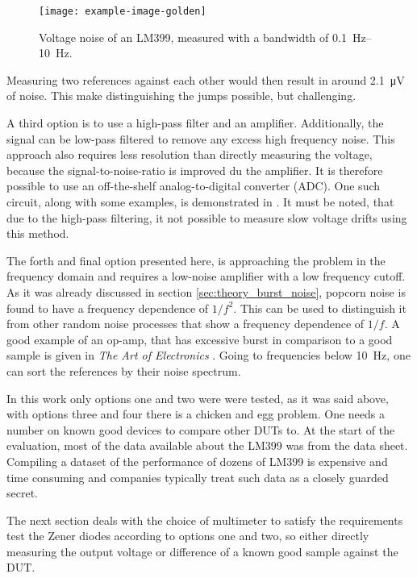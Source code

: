 \begin{figure}[ht]
    \centering
    \texttt{[image: example-image-golden]}
    \caption{Voltage noise of an LM399, measured with a bandwidth of \qtyrange{0.1}{10}{\Hz}.}
    \label{fig:noise_lm399}
\end{figure}

Measuring two references against each other would then result in around \qty{2.1}{\micro \volt} of noise. This make distinguishing the jumps possible, but challenging.

A third option is to use a high-pass filter and an amplifier. Additionally, the signal can be low-pass filtered to remove any excess high frequency noise. This approach also requires less resolution than directly measuring the voltage, because the signal-to-noise-ratio is improved du the amplifier. It is therefore possible to use an off-the-shelf analog-to-digital converter (ADC). One such circuit, along with some examples, is demonstrated in \cite{technote_ti_popcorn_noise,kay2012operational}. It must be noted, that due to the high-pass filtering, it not possible to measure slow voltage drifts using this method.

The forth and final option presented here, is approaching the problem in the frequency domain and requires a low-noise amplifier with a low frequency cutoff. As it was already discussed in section \ref{sec:theory_burst_noise}, popcorn noise is found to have a frequency dependence of $1/f^2$. This can be used to distinguish it from other random noise processes that show a frequency dependence of $1/f$. A good example of an op-amp, that has excessive burst in comparison to a good sample is given in \textit{The Art of Electronics} \citep[p. 478]{horowitz1989}. Going to frequencies below \qty{10}{\Hz}, one can sort the references by their noise spectrum.

In this work only options one and two were were tested, as it was said above, with options three and four there is a chicken and egg problem. One needs a number on known good devices to compare other DUTs to. At the start of the evaluation, most of the data available about the LM399 was from the data sheet. Compiling a dataset of the performance of dozens of LM399 is expensive and time consuming and companies typically treat such data as a closely guarded secret.

The next section deals with the choice of multimeter to satisfy the requirements test the Zener diodes according to options one and two, so either directly measuring the output voltage or difference of a known good sample against the DUT.

